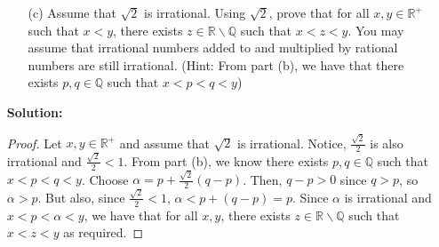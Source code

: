 \documentclass[letterpaper,12pt]{article}
\theoremstyle{definition}
\begin{document}
\pagebreak
\begin{enumerate}
    \item[] \begin{enumerate}
        \item[(c)] Assume that $\sqrt{2}$ is irrational. Using $\sqrt{2}$, prove that for all $x,y \in \mathbb{R}^+$ such that $x<y$, there exists $z \in \mathbb{R}\backslash \mathbb{Q}$ such that $x<z<y$. You may assume that irrational numbers added to and multiplied by rational numbers are still irrational. (Hint: From part (b), we have that there exists $p,q \in \mathbb{Q}$ such that $x<p<q<y$)
    \end{enumerate}
    \begin{mdframed}
            \textbf{Solution:}
            \begin{proof}
                Let $x,y \in \mathbb{R}^+$ and assume that $\sqrt{2}$ is irrational. Notice, $\frac{\sqrt{2}}{2}$ is also irrational and $\frac{\sqrt{2}}{2} < 1$. From part (b), we know there exists $p,q \in \mathbb{Q}$ such that $x<p<q<y$. Choose $\alpha = p + \frac{\sqrt{2}}{2}(q-p)$. Then, $q-p > 0$ since $q > p$, so $\alpha > p$. But also, since $\frac{\sqrt{2}}{2} < 1$, $\alpha < p + (q-p) = p $. Since $\alpha$ is irrational and $x < p < \alpha < y$, we have that for all $x,y$, there exists $z \in \mathbb{R} \backslash \mathbb{Q}$ such that $x < z < y$ as required.
            \end{proof}
        \end{mdframed}
\end{enumerate}
\pagebreak
\end{document}
